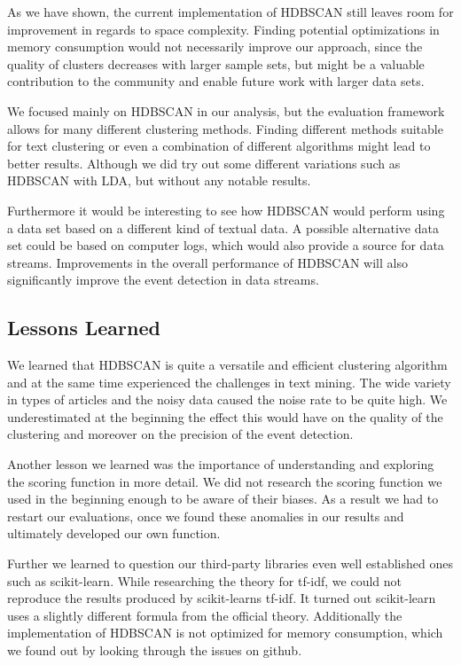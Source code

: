 As we have shown, the current implementation of HDBSCAN
still leaves room for improvement in regards to space complexity.
Finding potential optimizations in memory consumption would not necessarily improve our approach,
since the quality of clusters decreases with larger sample sets,
but might be a valuable contribution to the community and enable future work with larger data sets.

We focused mainly on HDBSCAN in our analysis, but the evaluation framework allows for many different clustering methods.
Finding different methods suitable for text clustering
or even a combination of different algorithms might lead to better results.
Although we did try out some different variations such as HDBSCAN with LDA,
but without any notable results.

Furthermore it would be interesting to see how HDBSCAN would perform
using a data set based on a different kind of textual data.
A possible alternative data set could be based on computer logs,
which would also provide a source for data streams.
Improvements in the overall performance of HDBSCAN will also significantly improve the event detection in data streams.

\subsection{Lessons Learned}
\label{subsec:6_lessons_learned}


We learned that HDBSCAN is quite a versatile and efficient clustering algorithm
and at the same time experienced the challenges in text mining. 
The wide variety in types of articles and the noisy data caused the noise rate to be quite high.
We underestimated at the beginning the effect this would have on the quality of the clustering 
and moreover on the precision of the event detection.

Another lesson we learned was the importance of understanding and exploring the scoring function in more detail.
We did not research the scoring function we used in the beginning enough to be aware of their biases.
As a result we had to restart our evaluations, once we found these anomalies in our results and 
ultimately developed our own function.  

Further we learned to question our third-party libraries even well established ones such as scikit-learn.
While researching the theory for tf-idf, we could not reproduce the results produced by scikit-learns tf-idf.
It turned out scikit-learn uses a slightly different formula from the official theory. 
Additionally the implementation of HDBSCAN is not optimized for memory consumption, 
which we found out by looking through the issues on github. 
